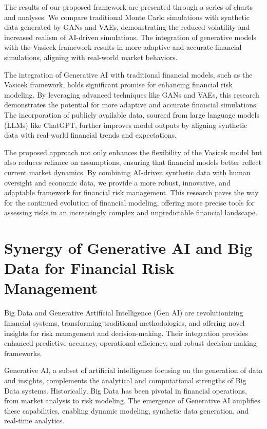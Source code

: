\documentclass[a4paper,12pt]{scrbook}
\begin{document}
	
	The results of our proposed framework are presented through a series of charts and analyses. We compare traditional Monte Carlo simulations with synthetic data generated by GANs and VAEs, demonstrating the reduced volatility and increased realism of AI-driven simulations. The integration of generative models with the Vasicek framework results in more adaptive and accurate financial simulations, aligning with real-world market behaviors.
	
	
	The integration of Generative AI with traditional financial models, such as the Vasicek framework, holds significant promise for enhancing financial risk modeling. By leveraging advanced techniques like GANs and VAEs, this research demonstrates the potential for more adaptive and accurate financial simulations. The incorporation of publicly available data, sourced from large language models (LLMs) like ChatGPT, further improves model outputs by aligning synthetic data with real-world financial trends and expectations.
	
	The proposed approach not only enhances the flexibility of the Vasicek model but also reduces reliance on assumptions, ensuring that financial models better reflect current market dynamics. By combining AI-driven synthetic data with human oversight and economic data, we provide a more robust, innovative, and adaptable framework for financial risk management. This research paves the way for the continued evolution of financial modeling, offering more precise tools for assessing risks in an increasingly complex and unpredictable financial landscape.
	
	
	\chapter{Synergy of Generative AI and Big Data for Financial Risk Management}
	
	Big Data and Generative Artificial Intelligence (Gen AI) are revolutionizing financial systems, transforming traditional methodologies, and offering novel insights for risk management and decision-making. Their integration provides enhanced predictive accuracy, operational efficiency, and robust decision-making frameworks.
	
	Generative AI, a subset of artificial intelligence focusing on the generation of data and insights, complements the analytical and computational strengths of Big Data systems. Historically, Big Data has been pivotal in financial operations, from market analysis to risk modeling. The emergence of Generative AI amplifies these capabilities, enabling dynamic modeling, synthetic data generation, and real-time analytics.
	
\end{document}

